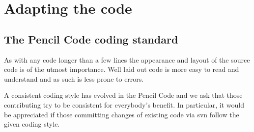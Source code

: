 \documentclass[\mydriver,12pt,twoside,notitlepage,a4paper]{article}
\begin{document}
\section{Adapting the code}

\subsection{The {\sc Pencil Code} coding standard}
\label{ProgrammingStyle}

As with any code longer than a few lines the appearance and layout
of the source code is of the utmost importance.  Well laid out
code is more easy to read and understand and as such is less prone
to errors.

A consistent coding style has evolved in the {\sc Pencil Code} and we
ask that those contributing try to be consistent for everybody's
benefit.  In particular, it would be appreciated if those committing
changes of existing code via svn follow the given coding style.
\end{document}
